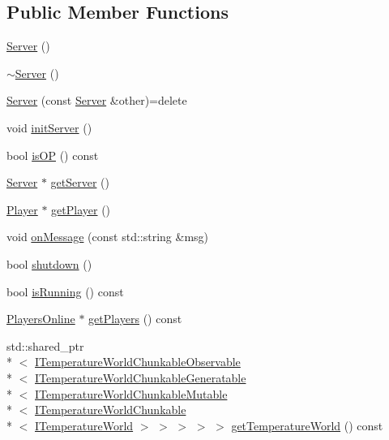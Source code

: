 \subsection*{Public Member Functions}
\begin{DoxyCompactItemize}
\item 
\hyperlink{class_server_ad5ec9462b520e59f7ea831e157ee5e59}{Server} ()
\item 
\hyperlink{class_server_a4b3aa2579cb1c8cd1d069582c14d0fa6}{$\sim$\-Server} ()
\item 
\hyperlink{class_server_aca4a9834f8bf136619d3c4cdb1db4e1e}{Server} (const \hyperlink{class_server}{Server} \&other)=delete
\item 
void \hyperlink{class_server_a7bc5c00fa3ae1ddfae71274ee7d025ea}{init\-Server} ()
\item 
bool \hyperlink{class_server_a7b6439f1e85af364215c544d675ea972}{is\-O\-P} () const 
\item 
\hyperlink{class_server}{Server} $\ast$ \hyperlink{class_server_a8af940772beedcc0b1243adf3f5aec0c}{get\-Server} ()
\item 
\hyperlink{struct_player}{Player} $\ast$ \hyperlink{class_server_a35be365123751e27d6c52ad3962b9b1e}{get\-Player} ()
\item 
void \hyperlink{class_server_a37a56fedea3137e9b8080ee0e86e8278}{on\-Message} (const std\-::string \&msg)
\item 
bool \hyperlink{class_server_a58c74bafaaf20b24e9243c7cf5fdfd16}{shutdown} ()
\item 
bool \hyperlink{class_server_ab8c22a0d6809e9aa84bebce478ba7bc5}{is\-Running} () const 
\item 
\hyperlink{class_players_online}{Players\-Online} $\ast$ \hyperlink{class_server_ab103cde2777536fa63b2746b6e0a98d4}{get\-Players} () const 
\item 
std\-::shared\-\_\-ptr\\*
$<$ \hyperlink{class_i_temperature_world_chunkable_observable}{I\-Temperature\-World\-Chunkable\-Observable}\\*
$<$ \hyperlink{class_i_temperature_world_chunkable_generatable}{I\-Temperature\-World\-Chunkable\-Generatable}\\*
$<$ \hyperlink{class_i_temperature_world_chunkable_mutable}{I\-Temperature\-World\-Chunkable\-Mutable}\\*
$<$ \hyperlink{class_i_temperature_world_chunkable}{I\-Temperature\-World\-Chunkable}\\*
$<$ \hyperlink{class_i_temperature_world}{I\-Temperature\-World} $>$ $>$ $>$ $>$ $>$ \hyperlink{class_server_adea320b40e941db6ab354c63de9128e3}{get\-Temperature\-World} () const 
\end{DoxyCompactItemize}


